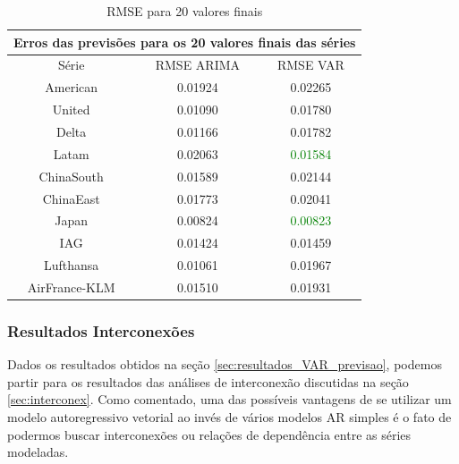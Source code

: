 \documentclass[12pt]{article}
\begin{document}
	 \begin{table}[H]\label{tab:RMSE_VAR_20}
	 	\centering
	 	
	 	\begin{tabular}{|c|c|c|}
	 		\hline
	 		\multicolumn{3}{|c|}{Erros das previsões para os 20 valores finais das séries} \\ \hline
	 		Série              & RMSE ARIMA      & RMSE VAR     \\ \hline
	 		American           & 0.01924                              & 0.02265      \\
	 		United             & 0.01090                              & 0.01780      \\
	 		Delta              & 0.01166                              & 0.01782      \\
	 		Latam              & 0.02063                              & \textcolor{green}{0.01584}      \\
	 		ChinaSouth         & 0.01589                              & 0.02144      \\
	 		ChinaEast          & 0.01773                              & 0.02041      \\
	 		Japan              & 0.00824                              & \textcolor{green}{0.00823}      \\
	 		IAG                & 0.01424                              & 0.01459      \\
	 		Lufthansa          & 0.01061                              & 0.01967      \\
	 		AirFrance-KLM      & 0.01510                              & 0.01931      \\ \hline
	 	\end{tabular}
 		\caption{RMSE para 20 valores finais}
	 \end{table}
 
	 
	\subsubsection{Resultados Interconexões}\label{sec:resultados_VAR_itnerconec}
	
	Dados os resultados obtidos na seção \ref{sec:resultados_VAR_previsao}, podemos partir para os resultados das análises de interconexão discutidas na seção \ref{sec:interconex}. Como comentado, uma das possíveis vantagens de se utilizar um modelo autoregressivo vetorial ao invés de vários modelos AR simples é o fato de podermos buscar interconexões ou relações de dependência entre as séries modeladas.
	
\end{document}
